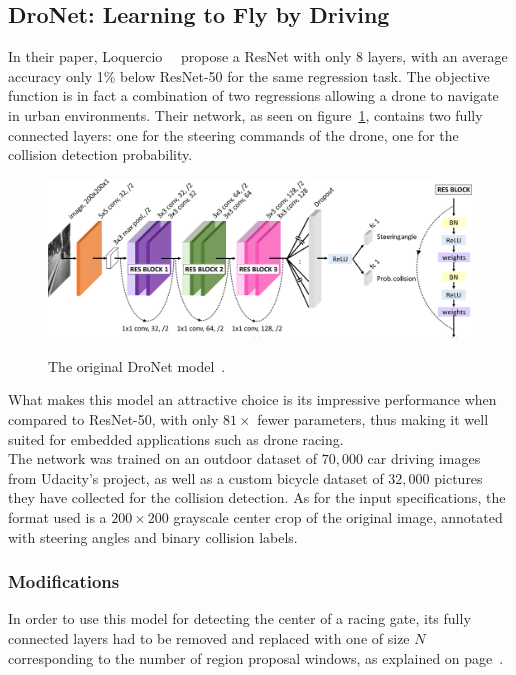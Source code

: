 \subsection{DroNet: Learning to Fly by Driving}

In their paper, Loquercio \etal~\cite{dronet}~propose a ResNet with only 8
layers, with an average accuracy only 1\% below ResNet-50 for the same
regression task. The objective function is in fact a combination of two
regressions allowing a drone to navigate in urban environments. Their network,
as seen on figure~\ref{fig:dronetoriginal}, contains two fully connected
layers: one for the steering commands of the drone, one for the collision
detection probability.

\begin{figure}[h]
	\center
	\includegraphics[width=\textwidth]{figure/dronet.png}
	\label{fig:dronetoriginal}
	\caption{The original DroNet model~\cite{dronet}.}
\end{figure}

What makes this model an attractive choice is its impressive performance when
compared to ResNet-50, with only $81\times$ fewer parameters, thus making it
well suited for embedded applications such as drone racing.\\

The network was trained on an outdoor dataset of $70,000$ car driving images
from Udacity's project, as well as a custom bicycle dataset of $32,000$
pictures they have collected for the collision detection. As for the input
specifications, the format used is a $200\times200$ grayscale center crop of
the original image, annotated with steering angles and binary collision labels.

\subsubsection{Modifications}

In order to use this model for detecting the center of a racing gate, its fully
connected layers had to be removed and replaced with one of size $N$
corresponding to the number of region proposal windows, as explained on
page~\pageref{fig:regionproposal}. 


